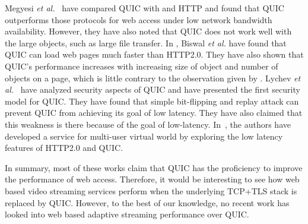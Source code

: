 Megyesi \textit{et al.}~\cite{Megyesi2016} have compared \ac{QUIC} with  and \ac{HTTP} and found that \ac{QUIC} outperforms those protocols for web access under low network bandwidth availability. However, they have also noted that \ac{QUIC} does not work well with the large objects, such as large file transfer. In \cite{Biswal2016}, Biswal \textit{et al.} have found that \ac{QUIC} can load web pages much faster than HTTP2.0. They have also shown that \ac{QUIC}'s performance increases with increasing size of object and number of objects on a page, which is little contrary to the observation given by \cite{Megyesi2016}. Lychev \textit{et al.}~\cite{Lychev2015} have analyzed security aspects of QUIC and have presented the first security model for \ac{QUIC}. They have found that simple bit-flipping and replay attack can prevent \ac{QUIC} from achieving its goal of low latency. They have also claimed that this weakness is there because of the goal of low-latency. In~\cite{bakri2015http}, the authors have developed a service for multi-user virtual world by exploring the low latency features of HTTP2.0 and \ac{QUIC}.

In summary, most of these works claim that \ac{QUIC} has the proficiency to improve the performance of web access.
Therefore, it would be interesting to see how web based video streaming services perform when the underlying \ac{TCP}+\ac{TLS} stack is replaced by \ac{QUIC}. However, to the best of our knowledge, no recent work has looked into web based adaptive streaming performance over \ac{QUIC}.


